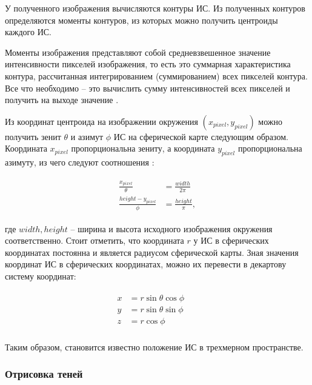 У полученного изображения вычисляются контуры ИС. Из полученных контуров определяются моменты контуров, из которых можно получить центроиды каждого ИС. 

Моменты изображения представляют собой средневзвешенное значение интенсивности пикселей изображения, то есть это суммарная характеристика контура, рассчитанная интегрированием (суммированием) всех пикселей контура. Все что необходимо -- это вычислить сумму интенсивностей всех пикселей и получить на выходе значение \cite{sns_tras}.

Из координат центроида на изображении окружения $(x_{pixel}, y_{pixel})$ можно получить зенит $\theta$ и азимут $\phi$ ИС на сферической карте следующим образом. Координата $x_{pixel}$ пропорциональна зениту, а координата $y_{pixel}$ пропорциональна азимуту, из чего следуют соотношения \cite{osti2019real}:

\begin{equation}
	\begin{aligned}
		\begin{split}
			\frac{x_{pixel}}{\theta} &= \frac{width}{2\pi} \\
			\frac{height - y_{pixel}}{\phi} &= \frac{height}{\pi}, 
		\end{split}
	\end{aligned}
\end{equation}

где $width, height$ -- ширина и высота исходного изображения окружения соответственно. Стоит отметить, что координата $r$ у ИС в сферических координатах постоянна и является радиусом сферической карты. Зная значения координат ИС в сферических координатах, можно их перевести в декартову систему координат:

\begin{equation}
	\begin{aligned}
		\begin{split}
			x &= r \sin\theta \cos\phi &&\\
			y &= r \sin\theta \sin\phi &&\\
			z &= r\cos\phi &&\\
		\end{split}
	\end{aligned}
\end{equation}

Таким образом, становится известно положение ИС в трехмерном пространстве.

\subsubsection*{Отрисовка теней}

